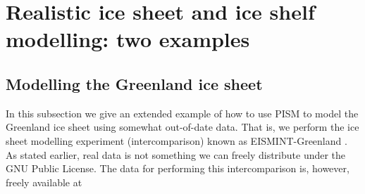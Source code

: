 \documentclass[11pt,final]{amsart}
\begin{document}

\clearpage\newpage
\section{Realistic ice sheet and ice shelf modelling: two examples}\label{sect:real}

\subsection{Modelling the Greenland ice sheet}\label{subsect:green}  In this subsection we give an extended example of how to use PISM to model the Greenland ice sheet using somewhat out-of-date data.  That is, we perform the ice sheet modelling experiment (intercomparison) known as EISMINT-Greenland \cite{RitzEISMINT}.  As stated earlier, real data is not something we can freely distribute under the GNU Public License.  The data for performing this intercomparison is, however, freely available at
\medskip
\end{document}
